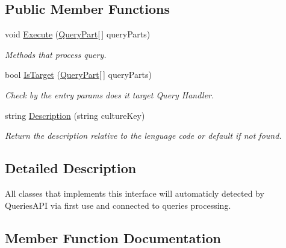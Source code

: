\subsection*{Public Member Functions}
\begin{DoxyCompactItemize}
\item 
void \mbox{\hyperlink{interface_uniform_queries_1_1_executable_1_1_i_query_handler_a3268d72c0388f5e3debba4d73bdfe523}{Execute}} (\mbox{\hyperlink{struct_uniform_queries_1_1_query_part}{Query\+Part}}\mbox{[}$\,$\mbox{]} query\+Parts)
\begin{DoxyCompactList}\small\item\em Methods that process query. \end{DoxyCompactList}\item 
bool \mbox{\hyperlink{interface_uniform_queries_1_1_executable_1_1_i_query_handler_a0f43184bf3e306a7cbebc39098f044ee}{Is\+Target}} (\mbox{\hyperlink{struct_uniform_queries_1_1_query_part}{Query\+Part}}\mbox{[}$\,$\mbox{]} query\+Parts)
\begin{DoxyCompactList}\small\item\em Check by the entry params does it target Query Handler. \end{DoxyCompactList}\item 
string \mbox{\hyperlink{interface_uniform_queries_1_1_executable_1_1_i_query_handler_ae0e55919571d5456af31298394d241a9}{Description}} (string culture\+Key)
\begin{DoxyCompactList}\small\item\em Return the description relative to the lenguage code or default if not found. \end{DoxyCompactList}\end{DoxyCompactItemize}


\subsection{Detailed Description}
All classes that implements this interface will automaticly detected by Queries\+A\+PI via first use and connected to queries processing. 



\subsection{Member Function Documentation}
\mbox{\label{interface_uniform_queries_1_1_executable_1_1_i_query_handler_ae0e55919571d5456af31298394d241a9}} 
